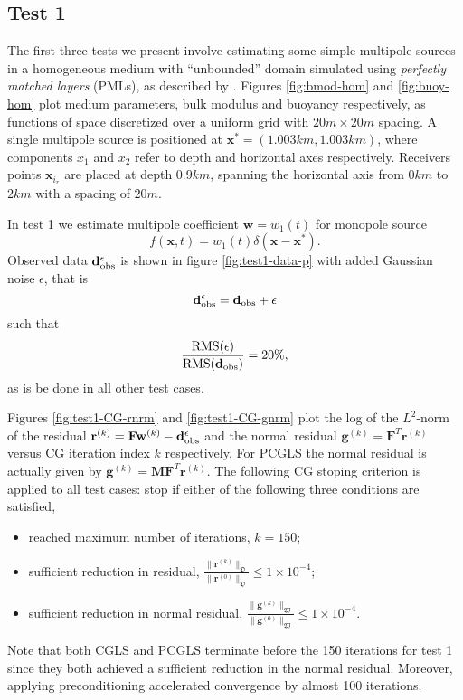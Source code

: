 \subsection{Test 1}

The first three tests we present involve estimating some simple multipole sources in a homogeneous medium with ``unbounded'' domain simulated using \emph{perfectly matched layers} (PMLs), as described by \cite{Habashy:07}.
Figures \ref{fig:bmod-hom} and \ref{fig:buoy-hom} plot medium parameters, bulk modulus and buoyancy respectively, as functions of space discretized over a uniform grid with $20m\times 20m$ spacing.
A single multipole source is positioned at $\mathbf x^*=(1.003km,1.003km)$, where components $x_1$ and $x_2$ refer to depth and horizontal axes respectively.
Receivers points $\mathbf x_{i_r}$ are placed at depth $0.9km$, spanning the horizontal axis from $0km$ to $2km$ with a spacing of $20m$. 

In test 1 we estimate multipole coefficient $\mathbf w = w_1(t)$ for monopole source
\[
	f(\mathbf x,t) = w_1(t) \delta(\mathbf x-\mathbf x^*).
\]
Observed data $\mathbf d_{\rm obs}^{\epsilon}$ is shown in figure \ref{fig:test1-data-p} with added Gaussian noise $\epsilon$, that is
\[
	\mathbf d_{\rm obs}^{\epsilon} = \mathbf d_{\rm obs} + \epsilon
\]
such that 
\[
	\frac{{\rm RMS}(\epsilon)}{{\rm RMS}(\mathbf d_{\rm obs})} = 20\%,
\]
as is be done in all other test cases.

Figures \ref{fig:test1-CG-rnrm} and \ref{fig:test1-CG-gnrm} plot the log of the $L^2$-norm of the residual $\mathbf r^{(k)} = \mathbf F \mathbf w^{(k)} -\mathbf d_{\rm obs}^{\epsilon}$ and the normal residual $\mathbf g^{(k)} = \mathbf F^T \mathbf r^{(k)}$ versus CG iteration index $k$ respectively.
For PCGLS the normal residual is actually given by $\mathbf g^{(k)} = \mathbf M \mathbf F^T\mathbf r^{(k)}$.
The following CG stoping criterion is applied to all test cases: stop if either of the following three conditions are satisfied,
\begin{itemize} 
	\item reached maximum number of iterations, $k=150$;
	\item sufficient reduction in residual, $\tfrac{\|\mathbf r^{(k)}\|_{\mathfrak D}}{\|\mathbf r^{(0)}\|_{\mathfrak D}} \le 1\times 10^{-4}$;
	\item sufficient reduction in normal residual, $\tfrac{\|\mathbf g^{(k)}\|_{\mathfrak W}}{\|\mathbf g^{(0)}\|_{\mathfrak W}} \le 1\times 10^{-4}$.
\end{itemize}
Note that both CGLS and PCGLS terminate before the 150 iterations for test 1 since they both achieved a sufficient reduction in the normal residual. 
Moreover, applying preconditioning accelerated convergence by almost 100 iterations.

